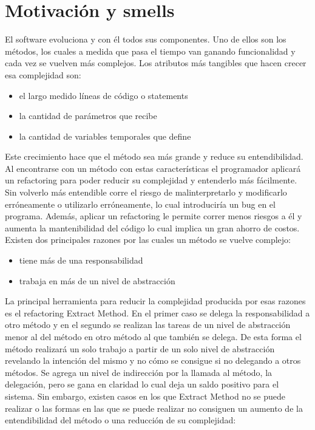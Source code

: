 \section{Motivación y smells}
El software evoluciona y con él todos sus componentes. Uno de ellos son los métodos, los cuales a
medida que pasa el tiempo van ganando funcionalidad y cada vez se vuelven más complejos. Los
atributos más tangibles que hacen crecer esa complejidad son:

\begin{itemize}
    \item el largo medido líneas de código o statements
    \item la cantidad de parámetros que recibe
    \item la cantidad de variables temporales que define
\end{itemize}

Este crecimiento hace que el método sea más grande y reduce su entendibilidad. Al encontrarse con un
método con estas características el programador aplicará un refactoring para poder reducir su
complejidad y entenderlo más fácilmente. Sin volverlo más entendible corre el riesgo de
malinterpretarlo y modificarlo erróneamente o utilizarlo erróneamente, lo cual introduciría un bug
en el programa. Además, aplicar un refactoring le permite correr menos riesgos a él y aumenta la
mantenibilidad del código lo cual implica un gran ahorro de costos.
Existen dos principales razones por las cuales un método se vuelve complejo:

\begin{itemize}
    \item tiene más de una responsabilidad
    \item trabaja en más de un nivel de abstracción
\end{itemize}

La principal herramienta para reducir la complejidad producida por esas razones es el refactoring
Extract Method. En el primer caso se delega la responsabilidad a otro método y en el segundo se
realizan las tareas de un nivel de abstracción menor al del método en otro método al que también se
delega. De esta forma el método realizará un solo trabajo a partir de un solo nivel de abstracción
revelando la intención del mismo y no cómo se consigue si no delegando a otros métodos. Se agrega un
nivel de indirección por la llamada al método, la delegación, pero se gana en claridad lo cual deja
un saldo positivo para el sistema. Sin embargo, existen casos en los que Extract Method no se puede
realizar o las formas en las que se puede realizar no consiguen un aumento de la entendibilidad del
método o una reducción de su complejidad:

